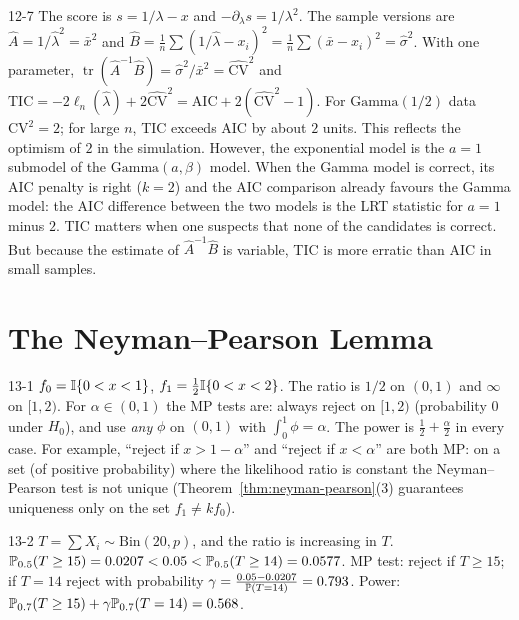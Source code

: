 \begin{solution}{12-7}
The score is $s=1/\lambda-x$ and $-\partial_\lambda s=1/\lambda^2$. The sample versions are $\hat A=1/\hat\lambda^2=\bar x^2$ and $\hat B=\frac1n\sum(1/\hat\lambda-x_i)^2=\frac1n\sum(\bar x-x_i)^2=\hat\sigma^2$. With one parameter, $\operatorname{tr}(\hat A^{-1}\hat B)=\hat\sigma^2/\bar x^2=\widehat{\mathrm{CV}}^2$ and $\mathrm{TIC}=-2\ell_n(\hat\lambda)+2\widehat{\mathrm{CV}}^2=\mathrm{AIC}+2(\widehat{\mathrm{CV}}^2-1)$. For $\text{Gamma}(1/2)$ data $\mathrm{CV}^2=2$; for large $n$, TIC exceeds AIC by about $2$ units. This reflects the optimism of $2$ in the simulation. However, the exponential model is the $a=1$ submodel of the $\text{Gamma}(a,\beta)$ model. When the Gamma model is correct, its AIC penalty is right ($k=2$) and the AIC comparison already favours the Gamma model: the AIC difference between the two models is the LRT statistic for $a=1$ minus $2$. TIC matters when one suspects that none of the candidates is correct. But because the estimate of $\hat A^{-1}\hat B$ is variable, TIC is more erratic than AIC in small samples.
\end{solution}

\section{The Neyman--Pearson Lemma}

\begin{solution}{13-1}
$f_0=\I\{0<x<1\}$, $f_1=\frac12\I\{0<x<2\}$. The ratio is $1/2$ on $(0,1)$ and $\infty$ on $[1,2)$. For $\alpha\in(0,1)$ the MP tests are: always reject on $[1,2)$ (probability $0$ under $H_0$), and use \emph{any} $\phi$ on $(0,1)$ with $\int_0^1\phi=\alpha$. The power is $\frac12+\frac\alpha2$ in every case. For example, ``reject if $x>1-\alpha$'' and ``reject if $x<\alpha$'' are both MP: on a set (of positive probability) where the likelihood ratio is constant the Neyman--Pearson test is not unique (Theorem~\ref{thm:neyman-pearson}(3) guarantees uniqueness only on the set $f_1\ne kf_0$).
\end{solution}

\begin{solution}{13-2}
$T=\sum X_i\sim\text{Bin}(20,p)$, and the ratio is increasing in $T$. $\P_{0.5}(T\ge15)=0.0207<0.05<\P_{0.5}(T\ge14)=0.0577$. MP test: reject if $T\ge15$; if $T=14$ reject with probability $\gamma=\frac{0.05-0.0207}{\P(T=14)}=0.793$. Power: $\P_{0.7}(T\ge15)+\gamma\P_{0.7}(T=14)=0.568$.
\end{solution}

